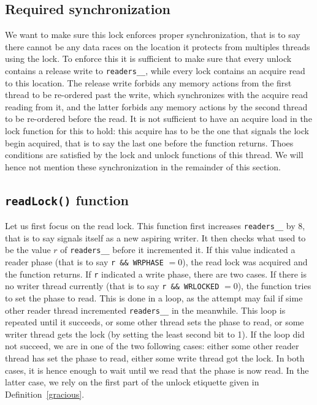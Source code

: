 		\subsection{Required synchronization}
		\label{synchGlib}
We want to make sure this lock enforces proper synchronization, that is to say there cannot be any data races on the location it protects from multiples threads using the lock. To enforce this it is sufficient to make sure that every unlock contains a release write to \texttt{readers\_\_}, while every lock contains an acquire read to this location. The release write forbids any memory actions from the first thread to be re-ordered past the write, which synchronizes with the acquire read reading from it, and the latter forbids any memory actions by the second thread to be re-ordered before the read. It is not sufficient to have an acquire load in the lock function for this to hold: this acquire has to be the one that signals the lock begin acquired, that is to say the last one before the function returns. Thoes conditions are satisfied by the lock and unlock functions of this thread. We will hence not mention these synchronization in the remainder of this section.

		\subsection{\texttt{readLock()} function}

		Let us first focus on the read lock. This function first increases \texttt{readers\_\_} by 8, that is to say signals itself as a new aspiring writer. It then checks what used to be the value $r$ of \texttt{readers\_\_} before it incremented it. If this value indicated a reader phase (that is to say \texttt{r \&\& WRPHASE} $ = 0$), the read lock was acquired and the function returns. If \texttt{r} indicated a write phase, there are two cases. If there is no writer thread currently (that is to say \texttt{r \&\& WRLOCKED} $= 0$), the function tries to set the phase to read. This is done in a loop, as the attempt may fail if sime other reader thread incremented \texttt{readers\_\_} in the meanwhile. This loop is repeated until it succeeds, or some other thread sets the phase to read, or some writer thread gets the lock (by setting the least second bit to 1). If the loop did not succeed, we are in one of the two following cases: either some other reader thread has set the phase to read, either some write thread got the lock. In both cases, it is hence enough to wait until we read that the phase is now read. In the latter case, we rely on the first part of the unlock etiquette given in Definition~\ref{gracious}.

